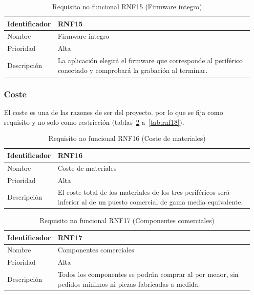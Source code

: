 \begin{table}[H]
	\centering
	\renewcommand{\arraystretch}{2}
	\begin{tabular}{|l|p{10cm}|}
		\hline
		Identificador & RNF15 \\
		\hline
		Nombre & Firmware íntegro \\
		\hline
		Prioridad & Alta \\
		\hline
		Descripción & La aplicación elegirá el firmware que corresponde al periférico conectado y comprobará la grabación al terminar. \\
		\hline
	\end{tabular}
	\caption{Requisito no funcional RNF15 (Firmware íntegro)}
	\label{tab:rnf15}
\end{table}

\subsubsection{Coste}

El coste es una de las razones de ser del proyecto, por lo que se fija como requisito y no solo como restricción (tablas~\ref{tab:rnf16} a~\ref{tab:rnf18}).

\begin{table}[H]
	\centering
	\renewcommand{\arraystretch}{2}
	\begin{tabular}{|l|p{10cm}|}
		\hline
		Identificador & RNF16 \\
		\hline
		Nombre & Coste de materiales \\
		\hline
		Prioridad & Alta \\
		\hline
		Descripción & El coste total de los materiales de los tres periféricos será inferior al de un puesto comercial de gama media equivalente. \\
		\hline
	\end{tabular}
	\caption{Requisito no funcional RNF16 (Coste de materiales)}
	\label{tab:rnf16}
\end{table}

\begin{table}[H]
	\centering
	\renewcommand{\arraystretch}{2}
	\begin{tabular}{|l|p{10cm}|}
		\hline
		Identificador & RNF17 \\
		\hline
		Nombre & Componentes comerciales \\
		\hline
		Prioridad & Alta \\
		\hline
		Descripción & Todos los componentes se podrán comprar al por menor, sin pedidos mínimos ni piezas fabricadas a medida. \\
		\hline
	\end{tabular}
	\caption{Requisito no funcional RNF17 (Componentes comerciales)}
	\label{tab:rnf17}
\end{table}

